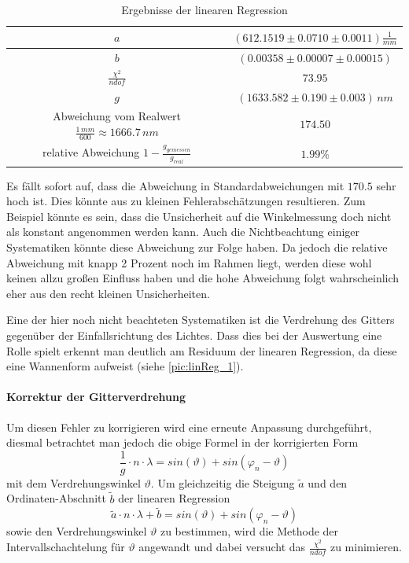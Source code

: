 \documentclass[a4paper, 11pt]{article}
\begin{document}
\begin{table}[H]
	\renewcommand{\arraystretch}{1.5}
	\large
	\centering
	\begin{tabular}{|c|c|}
		\hline
		$a$ &	$(612.1519 \pm 0.0710 \pm 0.0011) \frac{1}{mm}$ \\
		\hline
		$b$	&	$(0.00358 \pm 0.00007 \pm 0.00015) $ \\
		\hline
		$\frac{\chi^2}{ndof}$	&	$73.95$ \\
		\hline
		$g$	&	$(1633.582 \pm 0.190 \pm 0.003) \,nm$ \\
		\hline
		Abweichung vom Realwert $\frac{1 \,mm}{600} \approx	1666.7\, nm$	&	$ 174.50 $ \\
		\hline
		relative Abweichung $1 - \frac{g_{gemessen}}{g_{real}}$ &	$ 1.99 \%$ \\
		\hline
	\end{tabular}
	\caption{Ergebnisse der linearen Regression}
	\label{table: linReg_final}
\end{table}

Es fällt sofort auf, dass die Abweichung in Standardabweichungen mit $170.5$ sehr hoch ist. Dies könnte aus zu kleinen Fehlerabschätzungen resultieren. Zum Beispiel könnte es sein, dass die Unsicherheit auf die Winkelmessung doch nicht als konstant angenommen werden kann. Auch die Nichtbeachtung einiger Systematiken könnte diese Abweichung zur Folge haben. Da jedoch die relative Abweichung mit knapp 2 Prozent noch im Rahmen liegt, werden diese wohl keinen allzu großen Einfluss haben und die hohe Abweichung folgt wahrscheinlich eher aus den recht kleinen Unsicherheiten.

Eine der hier noch nicht beachteten Systematiken ist die Verdrehung des Gitters gegenüber der Einfallsrichtung des Lichtes. Dass dies bei der Auswertung eine Rolle spielt erkennt man deutlich am Residuum der linearen Regression, da diese eine Wannenform aufweist (siehe \ref{pic:linReg_1}). 

\paragraph{Korrektur der Gitterverdrehung}
Um diesen Fehler zu korrigieren wird eine erneute Anpassung durchgeführt, diesmal betrachtet man jedoch die obige Formel in der korrigierten Form 
\begin{equation}
\frac{1}{g} \cdot n \cdot \lambda = sin(\vartheta) + sin(\varphi_n - \vartheta)
\end{equation}
mit dem Verdrehungswinkel $\vartheta$. Um gleichzeitig die Steigung $\tilde{a}$ und den Ordinaten-Abschnitt $\tilde{b}$ der linearen Regression
\begin{equation}
\tilde{a} \cdot n \cdot \lambda + \tilde{b} = sin(\vartheta) + sin(\varphi_n - \vartheta)
\end{equation}
sowie den Verdrehungswinkel $\vartheta$ zu bestimmen, wird die Methode der Intervallschachtelung für $\vartheta$ angewandt und dabei versucht das $\frac{\chi^2}{ndof}$ zu minimieren.
\end{document}

